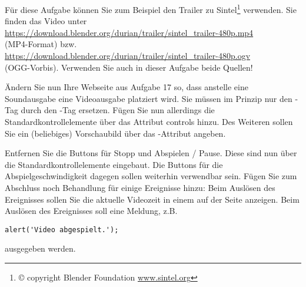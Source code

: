 %
\par Für diese Aufgabe können Sie zum Beispiel den Trailer zu Sintel\footnote{\small{©} copyright Blender Foundation  \textbar \vspace{1em} \url{www.sintel.org}} verwenden. Sie finden das Video unter\\
\url{https://download.blender.org/durian/trailer/sintel_trailer-480p.mp4}
\\(MP4-Format) bzw. \\
\url{https://download.blender.org/durian/trailer/sintel_trailer-480p.ogv} \\
(OGG-Vorbis). Verwenden Sie auch in dieser Aufgabe beide Quellen!
%
\par Ändern Sie nun Ihre Webseite aus Aufgabe 17 so, dass anstelle eine
Soundausgabe eine Videoausgabe platziert wird. Sie müssen im Prinzip nur den
-Tag durch den -Tag ersetzen. Fügen Sie nun allerdings
die Standardkontrollelemente über das Attribut controls hinzu. Des Weiteren
sollen Sie ein (beliebiges) Vorschaubild über das -Attribut
angeben.
%
\par Entfernen Sie die Buttons für Stopp und Abspielen / Pause. Diese sind nun
über die Standardkontrollelemente eingebaut. Die Buttons für die
Abspielgeschwindigkeit dagegen sollen weiterhin verwendbar sein. Fügen Sie zum
Abschluss noch Behandlung für einige Ereignisse hinzu: Beim Auslösen des
 Ereignisses sollen Sie die aktuelle Videozeit in einem
 auf der Seite anzeigen. Beim Auslösen des  Ereignisses
soll eine Meldung, z.B.
%
\begin{lstlisting}
alert('Video abgespielt.');
\end{lstlisting}
%
ausgegeben werden.